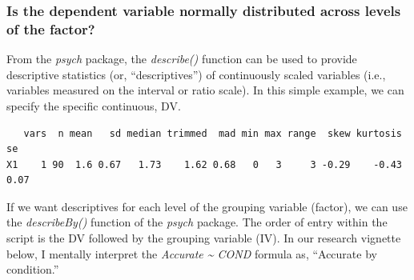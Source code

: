 \documentclass[
  11pt,
]{book}
\newenvironment{Shaded}{\begin{snugshade}}{\end{snugshade}}
\newcommand{\AttributeTok}[1]{\textcolor[rgb]{0.27,0.27,0.27}{#1}}
\newcommand{\CommentTok}[1]{\textcolor[rgb]{0.37,0.37,0.37}{\textit{#1}}}
\newcommand{\DecValTok}[1]{\textcolor[rgb]{0.06,0.06,0.06}{#1}}
\newcommand{\FunctionTok}[1]{\textcolor[rgb]{0.27,0.27,0.27}{\textbf{#1}}}
\newcommand{\NormalTok}[1]{#1}
\newcommand{\SpecialCharTok}[1]{\textcolor[rgb]{0.43,0.43,0.43}{\textbf{#1}}}
\begin{document}
\hypertarget{is-the-dependent-variable-normally-distributed-across-levels-of-the-factor}{%
\subsubsection{Is the dependent variable normally distributed across levels of the factor?}\label{is-the-dependent-variable-normally-distributed-across-levels-of-the-factor}}

From the \emph{psych} package, the \emph{describe()} function can be used to provide descriptive statistics (or, ``descriptives'') of continuously scaled variables (i.e., variables measured on the interval or ratio scale). In this simple example, we can specify the specific continuous, DV.

\begin{Shaded}
\end{Shaded}

\begin{verbatim}
   vars  n mean   sd median trimmed  mad min max range  skew kurtosis   se
X1    1 90  1.6 0.67   1.73    1.62 0.68   0   3     3 -0.29    -0.43 0.07
\end{verbatim}

If we want descriptives for each level of the grouping variable (factor), we can use the \emph{describeBy()} function of the \emph{psych} package. The order of entry within the script is the DV followed by the grouping variable (IV). In our research vignette below, I mentally interpret the \emph{Accurate \textasciitilde{} COND} formula as, ``Accurate by condition.''
\end{document}
